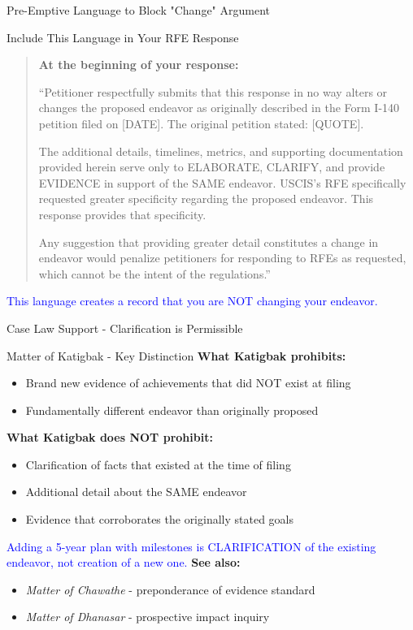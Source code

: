 \documentclass[11pt]{beamer}
\begin{document}
	\begin{frame}{Pre-Emptive Language to Block "Change" Argument}
		\scriptsize
		\begin{block}{Include This Language in Your RFE Response}
			\begin{quote}
				\textbf{At the beginning of your response:}
				
				``Petitioner respectfully submits that this response in no way alters or changes the proposed endeavor as originally described in the Form I-140 petition filed on [DATE]. The original petition stated: [QUOTE].
				
				The additional details, timelines, metrics, and supporting documentation provided herein serve only to ELABORATE, CLARIFY, and provide EVIDENCE in support of the SAME endeavor. USCIS's RFE specifically requested greater specificity regarding the proposed endeavor. This response provides that specificity.
				
				Any suggestion that providing greater detail constitutes a change in endeavor would penalize petitioners for responding to RFEs as requested, which cannot be the intent of the regulations.''
			\end{quote}
			\textcolor{blue}{This language creates a record that you are NOT changing your endeavor.}
		\end{block}
	\end{frame}
	
	\begin{frame}{Case Law Support - Clarification is Permissible}
		\scriptsize
		\begin{block}{Matter of Katigbak - Key Distinction}
			\textbf{What Katigbak prohibits:}
			\begin{itemize}
				\item Brand new evidence of achievements that did NOT exist at filing
				\item Fundamentally different endeavor than originally proposed
			\end{itemize}
			\textbf{What Katigbak does NOT prohibit:}
			\begin{itemize}
				\item Clarification of facts that existed at the time of filing
				\item Additional detail about the SAME endeavor
				\item Evidence that corroborates the originally stated goals
			\end{itemize}
			\textcolor{blue}{Adding a 5-year plan with milestones is CLARIFICATION of the existing endeavor, not creation of a new one.}
			\vspace{0.2cm}
			\textbf{See also:}
			\begin{itemize}
				\item \textit{Matter of Chawathe} - preponderance of evidence standard
				\item \textit{Matter of Dhanasar} - prospective impact inquiry
			\end{itemize}
		\end{block}
	\end{frame}
	
\end{document}
